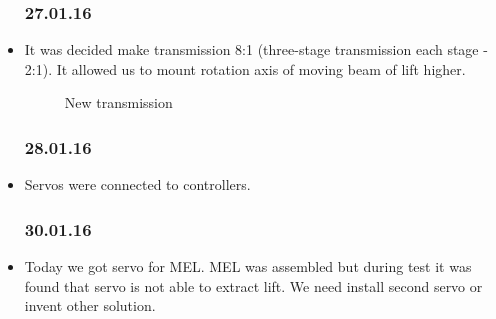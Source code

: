 \begin{itemize}
	\subsubsection{27.01.16}
		\item It was decided make transmission 8:1 (three-stage transmission each stage - 2:1). It allowed us to mount rotation axis of moving beam of lift higher. 
		\begin{figure}[H]
			\begin{minipage}[h]{1\linewidth}
				\caption{New transmission}
			\end{minipage}
		\end{figure}
	\subsubsection{28.01.16}
		\item Servos were connected to controllers.
	\subsubsection{30.01.16}
		\item Today we got servo for MEL. MEL was assembled but during test it was found that servo is not able to extract lift. We need install second servo or invent other solution.		
			
		
\end{itemize}		
\fillpage